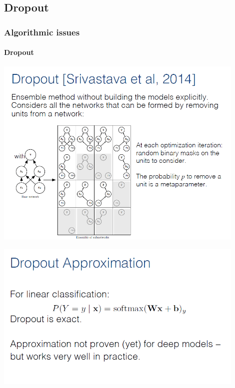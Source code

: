 \documentclass{beamer}
\begin{document}
\subsection{Dropout}

\begin{frame}
\frametitle{Algorithmic issues}
\framesubtitle{Dropout}
\includegraphics[width=0.9\textwidth]{images/drop_out_1.PNG} \\
\end{frame}
\begin{frame}
\includegraphics[width=0.9\textwidth]{images/drop_out_4.PNG} \\
\end{frame}
\end{document}
